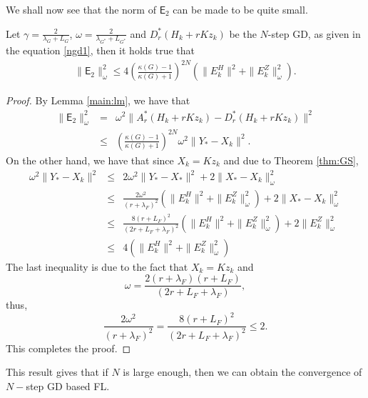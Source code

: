 \begin{itemize}
\begin{remark}
\end{remark}
We shall now see that the norm of $\textsf{E}_2$ can be made to be quite small. 
\begin{lemma}
Let $\gamma = \frac{2}{\lambda_G + L_G}$, $\omega = \frac{2}{\lambda_{G^*} + L_{G^*}}$ and $D_r^*(H_k + rKz_k)$ be the $N$-step GD, as given in the equation \eqref{ngd1}, then it holds true that 
\begin{eqnarray*}
\|\textsf{E}_2\|_\omega^2 \leq 4 \left ( \frac{\kappa(G) - 1}{\kappa(G) + 1} \right )^{2N} \left ( \|E_k^H\|^2 + \|E_k^Z\|_\omega^2 \right ). 
\end{eqnarray*}
\end{lemma}
\begin{proof}
By Lemma \ref{main:lm}, we have that 
\begin{eqnarray*}
\|\textsf{E}_2\|_\omega^2 &=& \omega^2 \|A_r^*(H_k + rKz_k) - D_r^*(H_k + rKz_k)\|^2 \\
&\leq& \left ( \frac{\kappa(G) - 1}{\kappa(G) + 1} \right )^{2N} \omega^2 \|Y_* - X_k\|^2. 
\end{eqnarray*}
On the other hand, we have that since $X_k = Kz_k$ and due to Theorem \ref{thm:GS},  
\begin{eqnarray*}
\omega^2 \|Y_* - X_k\|^2 &\leq& 2 \omega^2 \|Y_* - X_*\|^2 + 2 \|X_* - X_k\|_\omega^2 \\ 
&\leq& \frac{2 \omega^2}{(r + \lambda_F)^2} \left ( \|E_k^H\|^2 + \|E_k^Z\|_\omega ^2 \right ) + 2 \|X_* - X_k\|_\omega^2 \\
&\leq& \frac{8(r + L_F)^2}{(2r + L_F + \lambda_F)^2} \left ( \|E_k^H\|^2 + \|E_k^Z\|_\omega ^2 \right ) + 2 \|E_k^Z\|_\omega^2 \\ 
&\leq& 4 \left ( \|E_k^H\|^2 + \|E_k^Z\|_\omega ^2 \right ) \end{eqnarray*} 
The last inequality is due to the fact that $X_k = Kz_k$ and 
\begin{equation}
\omega = \frac{2(r + \lambda_F)(r + L_F)}{(2r + L_F + \lambda_F)},
\end{equation} 
thus, 
\begin{equation}
\frac{2 \omega^2}{(r + \lambda_F)^2} = \frac{8(r+L_F)^2}{(2r + L_F + \lambda_F)^2} \leq 2.  
\end{equation}
This completes the proof. 
\end{proof}
This result gives that if $N$ is large enough, then we can obtain the convergence of $N-$step GD based FL. 






\end{itemize}
